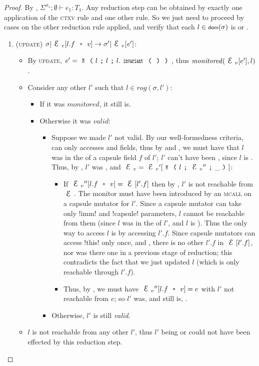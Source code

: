 \begin{proof}
By , $\Sigma^{\sigma_1};\emptyset\vdash e_1: T_1$. Any reduction step can be obtained by exactly one application of the \textsc{ctxv} rule and one other rule. So we just need to proceed by cases on the other reduction rule applied, and verify that each $l \in \dom(\s)$ is \valid or \mony.
\begin{enumerate}
\item (\textsc{update}) $\sigma|\ctx_v[l.f\equals v]\rightarrow \sigma'|\ctx_v[\e']$:
	\begin{itemize}
	  \item By \textsc{update}, $\e'=\M{l}{l}{l.\invariant}$, thus $\mathit{monitored}(\EV[e'],l)$.
	  \item Consider any other $l'$ such that $l\in \mathit{rog}(\sigma,l')$:
	  \begin{itemize}
	  	\item If it was $\mathit{monitored}$, it still is.
	    \item Otherwise it was $\mathit{valid}$:
			\begin{itemize}
				\item Suppose we made $l'$ not valid. By our well-formedness criteria, \Q@invariant@ can only accesses \Q@imm@ and \Q@capsule@ fields, thus by  and , we must have that $l$ was in the \rog of a capsule field $f$ of $l'$; $l'$ can't have been \CNE, since $l$ is \muty. Thus, by \CFS, $l'$ was \CNO, and $\EV = \EV'[\M{l}{\EV''}{\_}]$:
				\begin{itemize}
					\item If $\EV''[l.f \equals v] = \E[l'.f]$ then by \CNO, $l'$ is not reachable from $\E$. The monitor must have been introduced by an \textsc{mcall} on a capsule mutator for $l'$. Since a capsule mutator can take only \Q!imm! and \Q!capsule! parameters, $l$ cannot be reachable from them (since $l$ was in the \rog of $l'$, and $l$ is \muty). Thus the only way to access $l$ is by accessing $l'.f$.
					Since capsule mutators can access \Q!this! only once, and , there is no other $l'.f$ in $\E[l'.f]$, nor was there one in a previous stage of reduction; this contradicts the fact that we just updated $l$ (which is only reachable through $l'.f$).
					\item Thus, by \CNO, we must have $\EV''[l.f \equals v] = e$ with $l'$ not reachable from $e$; so $l'$ was, and still is, \mony.
				\end{itemize}
				\item Otherwise, $l'$ is still \emph{valid}.
		  	\end{itemize}
	  \end{itemize}
	  \item $l$ is not reachable from any other $l'$, thus $l'$ being \valid or \mony could not have been effected by this reduction step.
	\end{itemize}


\end{enumerate}
\end{proof}
